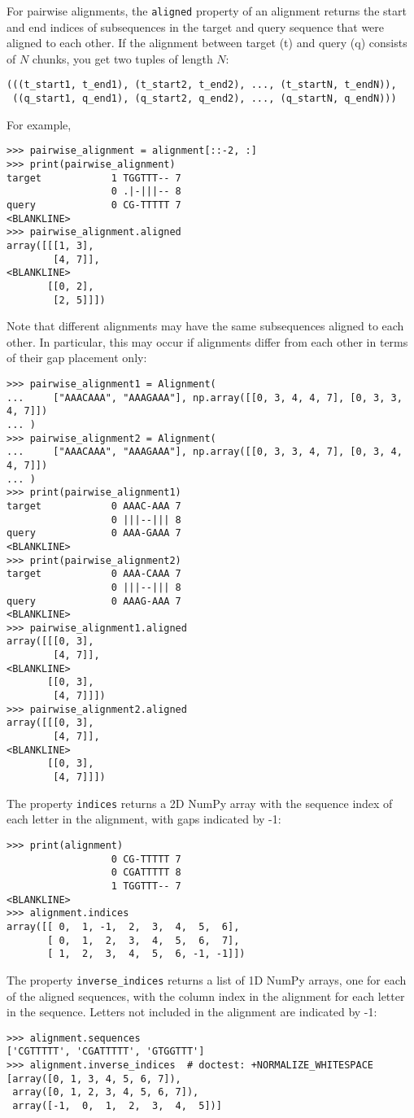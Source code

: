 For pairwise alignments, the \verb|aligned| property of an alignment returns the start and end indices of subsequences in the target and query sequence that were aligned to each other.  If the alignment between target (t) and query (q) consists of $N$ chunks, you get two tuples of length $N$:
\begin{verbatim}
(((t_start1, t_end1), (t_start2, t_end2), ..., (t_startN, t_endN)),
 ((q_start1, q_end1), (q_start2, q_end2), ..., (q_startN, q_endN)))
\end{verbatim}
For example,
\begin{verbatim}
>>> pairwise_alignment = alignment[::-2, :]
>>> print(pairwise_alignment)
target            1 TGGTTT-- 7
                  0 .|-|||-- 8
query             0 CG-TTTTT 7
<BLANKLINE>
>>> pairwise_alignment.aligned
array([[[1, 3],
        [4, 7]],
<BLANKLINE>
       [[0, 2],
        [2, 5]]])
\end{verbatim}
Note that different alignments may have the same subsequences aligned to each other. In particular, this may occur if alignments differ from each other in terms of their gap placement only:
\begin{verbatim}
>>> pairwise_alignment1 = Alignment(
...     ["AAACAAA", "AAAGAAA"], np.array([[0, 3, 4, 4, 7], [0, 3, 3, 4, 7]])
... )
>>> pairwise_alignment2 = Alignment(
...     ["AAACAAA", "AAAGAAA"], np.array([[0, 3, 3, 4, 7], [0, 3, 4, 4, 7]])
... )
>>> print(pairwise_alignment1)
target            0 AAAC-AAA 7
                  0 |||--||| 8
query             0 AAA-GAAA 7
<BLANKLINE>
>>> print(pairwise_alignment2)
target            0 AAA-CAAA 7
                  0 |||--||| 8
query             0 AAAG-AAA 7
<BLANKLINE>
>>> pairwise_alignment1.aligned
array([[[0, 3],
        [4, 7]],
<BLANKLINE>
       [[0, 3],
        [4, 7]]])
>>> pairwise_alignment2.aligned
array([[[0, 3],
        [4, 7]],
<BLANKLINE>
       [[0, 3],
        [4, 7]]])
\end{verbatim}

The property \verb|indices| returns a 2D NumPy array with the sequence index of each letter in the alignment, with gaps indicated by -1:
\begin{verbatim}
>>> print(alignment)
                  0 CG-TTTTT 7
                  0 CGATTTTT 8
                  1 TGGTTT-- 7
<BLANKLINE>
>>> alignment.indices
array([[ 0,  1, -1,  2,  3,  4,  5,  6],
       [ 0,  1,  2,  3,  4,  5,  6,  7],
       [ 1,  2,  3,  4,  5,  6, -1, -1]])
\end{verbatim}
The property \verb|inverse_indices| returns a list of 1D NumPy arrays, one for each of the aligned sequences, with the column index in the alignment for each letter in the sequence. Letters not included in the alignment are indicated by -1:
\begin{verbatim}
>>> alignment.sequences
['CGTTTTT', 'CGATTTTT', 'GTGGTTT']
>>> alignment.inverse_indices  # doctest: +NORMALIZE_WHITESPACE
[array([0, 1, 3, 4, 5, 6, 7]),
 array([0, 1, 2, 3, 4, 5, 6, 7]),
 array([-1,  0,  1,  2,  3,  4,  5])]
\end{verbatim}

